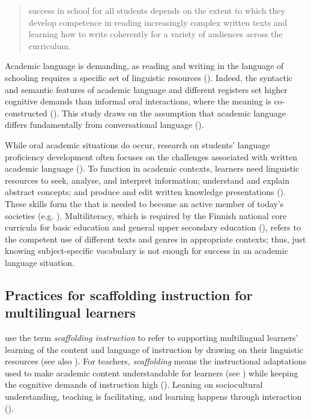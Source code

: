\documentclass[output=paper]{langscibook}
\begin{document}
\begin{quote}
success in school for all students depends on the extent to which they develop competence in reading increasingly complex written texts and learning how to write coherently for a variety of audiences across the curriculum. 
\end{quote}

Academic language is demanding, as reading and writing in the language of schooling requires a specific set of linguistic resources (\citealt{Cummins2021,Gibbons2014}). Indeed, the syntactic and semantic features of academic language and different registers set higher cognitive demands than informal oral interactions, where the meaning is co-constructed (\citealt{Schleppegrell2002}). This study draws on the assumption that academic language differs fundamentally from conversational language (\citealt{Cummins2000,Gibbons2014,Schleppegrell2002}).

While oral academic situations do occur, research on students' language proficiency development often focuses on the challenges associated with written academic language (\citealt{Biber1986,GumperzEtAl1984,MichaelsCollins1984,Wong_fillmore2000-2}). To function in academic contexts, learners need linguistic resources to seek, analyse, and interpret information; understand and explain abstract concepts; and produce and edit written knowledge presentations (\citealt{Cummins2000,Gibbons2014}). These skills form the  that is needed to become an active member of today’s societies (e.g. \citealt{CopeKalantzis2000}). Multiliteracy, which is required by the Finnish national core curricula for basic education and general upper secondary education (\citealt{EDUFI2014, Edufi2019}), refers to the competent use of different texts and genres in appropriate contexts; thus, just knowing subject-specific vocabulary is not enough for success in an academic language situation.

\subsection{Practices for scaffolding instruction for multilingual learners}\label{sec:heikkola:3.2}

\citet{LucasVillegas2013} use the term \textit{scaffolding instruction} to refer to supporting multilingual learners’ learning of the content and language of instruction by drawing on their linguistic resources (see also \citealt{Vygotsky1978}). For teachers, \textit{scaffolding} means the instructional adaptations used to make academic content understandable for learners (see \citealt{Gibbons2014}) while keeping the cognitive demands of instruction high (\citealt{VillegasEtAl2018}). Leaning on sociocultural understanding, teaching is facilitating, and learning happens through interaction (\citealt{Teemant2014}).
\end{document}
